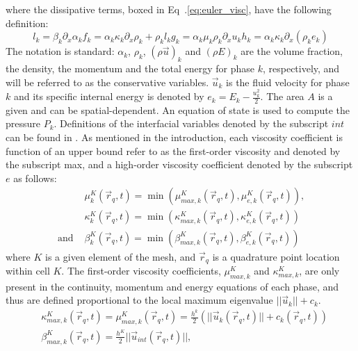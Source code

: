 \documentclass{anstrans}
\begin{document}
where the dissipative terms, boxed in Eq~.\ref{eq:euler_visc}, have the following definition:
\begin{subequations}
%
\begin{equation}
  l_k = \beta_k \partial_x \alpha_k 
\end{equation}
%  
\begin{equation}
  f_k = \alpha_k \kappa_k \partial_x \rho_k + \rho_k l_k 
\end{equation}
%  
\begin{equation}
  g_k = \alpha_k \mu_k \rho_k \partial_x u_k 
\end{equation}  
%
\begin{equation}
  h_k =  \alpha_k \kappa_k \partial_x \left( \rho_k e_k \right)
 \end{equation}
%
\end{subequations}
The notation is standard: $\alpha_k$, $\rho_k$, $(\rho \vec{u})_k$ and $(\rho E)_k$ are the volume fraction, the density, the momentum and the total energy for phase $k$, respectively, and will be referred to as the conservative variables. $\vec{u}_k$ is the fluid velocity for phase $k$ and its specific internal energy is denoted by $e_k=E_k-\tfrac{u^2_k}{2}$. The area $A$ is a given and can be spatial-dependent. An equation of state is used to compute the pressure $P_k$. Definitions of the interfacial variables denoted by the subscript $int$ can be found in \cite{berry}. As mentioned in the introduction, each viscosity coefficient is function of an upper bound refer to as the first-order viscosity and denoted by the subscript max, and a high-order viscosity coefficient denoted by the subscript $e$ as follows: 
%
\begin{align}
&\mu_k^K(\vec{r}_q,t) = \min ( \mu_{max,k}^K(\vec{r}_q,t), \mu_{e,k}^K(\vec{r}_q,t) ) \text{, } \nonumber \\
&\kappa_k^K(\vec{r}_q,t) = \min ( \kappa_{max,k}^K(\vec{r}_q,t), \kappa_{e,k}^K(\vec{r}_q,t) )\nonumber  \\ 
\text{ and } &\beta_k^K(\vec{r}_q,t) = \min ( \beta_{max,k}^K(\vec{r}_q,t), \beta_{e,k}^K(\vec{r}_q,t) ) \nonumber
\end{align}
%
where $K$ is a given element of the mesh, and $\vec{r}_q$ is a quadrature point location within cell $K$.
The first-order viscosity coefficients, $\mu^K_{max,k}$ and $\kappa^K_{max,k}$, are only present in the continuity, momentum and energy equations of each phase, and thus are defined proportional to the local maximum eigenvalue $|| \vec{u}_k || + c_k$. 
%
\begin{align}
&\kappa_{max,k}^K(\vec{r}_q,t) = \mu_{max,k}^K(\vec{r}_q,t) = \frac{h^k}{2} (|| \vec{u}_k(\vec{r}_q,t) || +c_k(\vec{r}_q,t) ) \nonumber \\
&\beta_{max,k}^K(\vec{r}_q,t) = \frac{h^K}{2} ||\vec{u}_{int}(\vec{r}_q,t) ||, \nonumber
\end{align}
\end{document}
